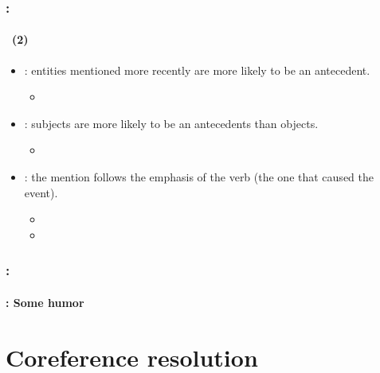 \documentclass[xcolor=table]{beamer}
\begin{document}
\begin{frame}
	\frametitle{\insertshortsubtitle: \insertsection}
	\framesubtitle{\insertsubsection\ (2)}
	
	\begin{itemize}
		
		\item {}: entities mentioned more recently are more likely to be an antecedent.
		\begin{itemize}
			\item {}
		\end{itemize}
		
		\item {}: subjects are more likely to be an antecedents than objects.
		\begin{itemize}
			\item {}
		\end{itemize}
		
		\item {}: the mention follows the emphasis of the verb (the one that caused the event).
		\begin{itemize}
			\item {}
			\item {}
		\end{itemize}
	\end{itemize}
	
\end{frame}

\begin{frame}
	\frametitle{\insertshortsubtitle: \insertsection}
	\framesubtitle{\insertsubsection: Some humor}
	
	\begin{center}
	\end{center}
	
\end{frame}

\section{Coreference resolution}
\end{document}
